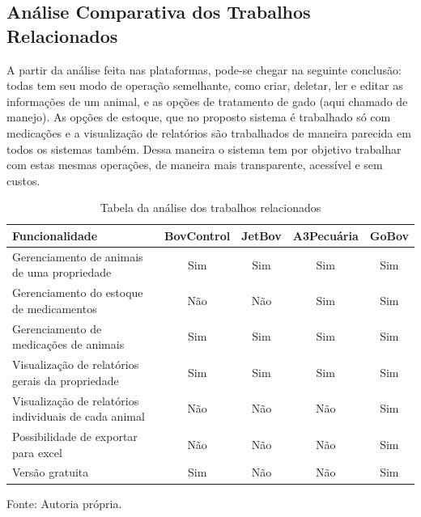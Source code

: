 


\subsection{\textbf{Análise Comparativa dos Trabalhos Relacionados}}

A partir da análise feita nas plataformas, pode-se chegar na seguinte conclusão: todas tem seu modo de operação semelhante, como criar, deletar, ler e editar as informações de um animal, e as opções de tratamento de gado (aqui chamado de manejo). As opções de estoque, que no proposto sistema é trabalhado só com medicações e a visualização de relatórios são trabalhados de maneira parecida em todos os sistemas também. Dessa maneira o sistema tem por objetivo trabalhar com estas mesmas operações, de maneira mais transparente, acessível e sem custos.


\begin{table}[H]
	\begin{center}
		\caption{Tabela da análise dos trabalhos relacionados}
		\begin{tabular}{ | p{8cm} |  c | c | c | c |}
			\hline
			Funcionalidade & BovControl & JetBov & A3Pecuária & GoBov \\ \hline
			Gerenciamento de animais de uma propriedade & Sim & Sim & Sim & Sim \\  \hline
			Gerenciamento do estoque de medicamentos  & Não & Não & Sim & Sim  \\ \hline
			Gerenciamento de medicações de animais & Sim & Sim & Sim & Sim  \\ \hline
			Visualização de relatórios gerais da propriedade & Sim & Sim & Sim & Sim  \\ \hline
			Visualização de relatórios individuais de cada animal & Não & Não & Não & Sim  \\ \hline
			Possibilidade de exportar para excel & Não & Não & Não & Sim  \\ \hline
			Versão gratuita & Sim & Não & Não & Sim  \\
			\hline
		\end{tabular}
		Fonte: Autoria própria.
	\end{center}
\end{table}


